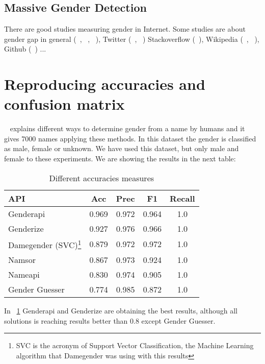 \documentclass[a4paper]{article}
\begin{document}
\subsection{Massive Gender Detection}

There are good studies measuring gender in Internet. Some studies are
about gender gap in general (~\cite{robles2014floss},
~\cite{holman2018gender}, ~\cite{dollar1999gender}), Twitter
(~\cite{burger2011discriminating}, ~\cite{mislove2011understanding})
Stackoverflow (~\cite{vasilescu2012gender}), Wikipedia
(~\cite{antin2011gender}, ~\cite{hill2013wikipedia}), Github
(~\cite{vasilescu2015gender}) ...

\section{Reproducing accuracies and confusion matrix}

~\cite{10.7717/peerj-cs.156} explains different ways to determine
gender from a name by humans and it gives 7000 names applying these
methods. In this dataset the gender is classified as male, female or
unknown. We have used this dataset, but only male and female to these
experiments. We are showing the results in the next table:

\begin{table}
\footnotesize
\begin{tabular}[]{lcccc}
  \hline
  API & Acc & Prec & F1 & Recall\tabularnewline
\hline
Genderapi & 0.969 & 0.972 & 0.964 & 1.0\tabularnewline
Genderize & 0.927 & 0.976 & 0.966 & 1.0\tabularnewline
Damegender (SVC)\footnote{SVC is the acronym of Support Vector Classification, the Machine Learning algorithm that Damegender was using with this results} & 0.879 & 0.972 & 0.972 & 1.0\tabularnewline
Namsor & 0.867 & 0.973 & 0.924 & 1.0\tabularnewline
Nameapi & 0.830 & 0.974 & 0.905 & 1.0\tabularnewline
Gender Guesser & 0.774 & 0.985 & 0.872 & 1.0\tabularnewline
\hline
\end{tabular}
\caption{Different accuracies measures}
\label{table:DifferentAccuraciesMeasures}
\end{table}

In ~\ref{table:DifferentAccuraciesMeasures} Genderapi and Genderize
are obtaining the best results, although all solutions is reaching
results better than 0.8 except Gender Guesser.
\end{document}
